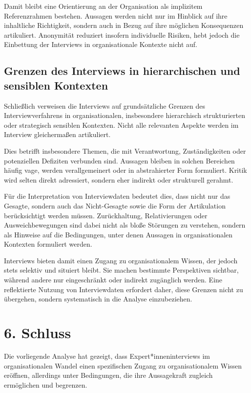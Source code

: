 \documentclass[a4paper,
fontsize=11pt,
oneside,
numbers=noperiodatend,
parskip=half-,
bibliography=totoc,
final
]{scrartcl}
\begin{document}
Damit bleibt eine Orientierung an der Organisation als implizitem
Referenzrahmen bestehen. Aussagen werden nicht nur im Hinblick auf ihre
inhaltliche Richtigkeit, sondern auch in Bezug auf ihre möglichen
Konsequenzen artikuliert. Anonymität reduziert insofern individuelle
Risiken, hebt jedoch die Einbettung der Interviews in organisationale
Kontexte nicht auf.

\subsection{Grenzen des Interviews in hierarchischen und sensiblen
Kontexten}\label{grenzen-des-interviews-in-hierarchischen-und-sensiblen-kontexten}

Schließlich verweisen die Interviews auf grundsätzliche Grenzen des
Interviewverfahrens in organisationalen, insbesondere hierarchisch
strukturierten oder strategisch sensiblen Kontexten. Nicht alle
relevanten Aspekte werden im Interview gleichermaßen artikuliert.

Dies betrifft insbesondere Themen, die mit Verantwortung,
Zuständigkeiten oder potenziellen Defiziten verbunden sind. Aussagen
bleiben in solchen Bereichen häufig vage, werden verallgemeinert oder in
abstrahierter Form formuliert. Kritik wird selten direkt adressiert,
sondern eher indirekt oder strukturell gerahmt.

Für die Interpretation von Interviewdaten bedeutet dies, dass nicht nur
das Gesagte, sondern auch das Nicht-Gesagte sowie die Form der
Artikulation berücksichtigt werden müssen. Zurückhaltung,
Relativierungen oder Ausweichbewegungen sind dabei nicht als bloße
Störungen zu verstehen, sondern als Hinweise auf die Bedingungen, unter
denen Aussagen in organisationalen Kontexten formuliert werden.

Interviews bieten damit einen Zugang zu organisationalem Wissen, der
jedoch stets selektiv und situiert bleibt. Sie machen bestimmte
Perspektiven sichtbar, während andere nur eingeschränkt oder indirekt
zugänglich werden. Eine reflektierte Nutzung von Interviewdaten
erfordert daher, diese Grenzen nicht zu übergehen, sondern systematisch
in die Analyse einzubeziehen.

\section{6. Schluss}\label{schluss}

Die vorliegende Analyse hat gezeigt, dass Expert*inneninterviews im
organisationalen Wandel einen spezifischen Zugang zu organisationalem
Wissen eröffnen, allerdings unter Bedingungen, die ihre Aussagekraft
zugleich ermöglichen und begrenzen.
\end{document}
